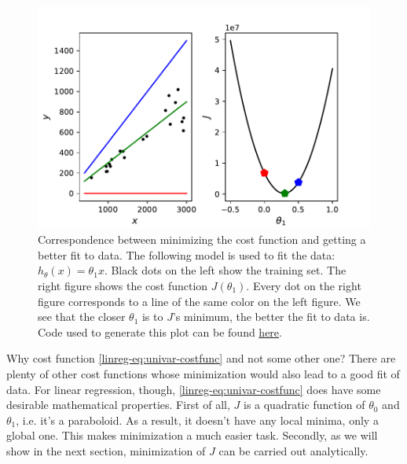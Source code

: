 \documentclass{article}
\theoremstyle{definition}
\begin{document}
\begin{figure}[ht]
\centering
\includegraphics[scale=0.7]{images/lin_reg/costfunc.pdf}
\caption{Correspondence between minimizing the cost function and getting a better fit to data. The following model is used to fit the data: $h_{\theta}(x) = \theta_1 x$. Black dots on the left show the training set. The right figure shows the cost function $J(\theta_1)$. Every dot on the right figure corresponds to a line of the same color on the left figure. We see that the closer $\theta_1$ is to $J$'s minimum, the better the fit to data is. Code used to generate this plot can be found \href{https://github.com/siavashaslanbeigi/ml_notes/blob/master/src/lin_reg/costfunction.ipynb}{here}.}
\label{linreg-fig:costfunc}
\end{figure}

Why cost function \eqref{linreg-eq:univar-costfunc} and not some other one? There are plenty of other cost functions whose minimization would also lead to a good fit of data. For linear regression, though, \eqref{linreg-eq:univar-costfunc} does have some desirable mathematical properties. First of all, $J$ is a quadratic function of $\theta_0$ and $\theta_1$, i.e. it's a paraboloid. As a result, it doesn't have any local minima, only a global one. This makes minimization a much easier task. Secondly, as we will show in the next section, minimization of $J$ can be carried out analytically.

\end{document}
